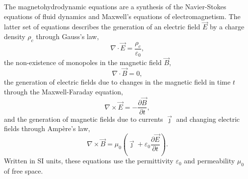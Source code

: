 The magnetohydrodynamic equations are a synthesis of the Navier-Stokes equations of fluid dynamics and Maxwell's equations of electromagnetism. The latter set of equations describes the generation of an electric field $\vec{E}$ by a charge density $\rho_c$ through Gauss's law,
\begin{equation}
  \label{eq:gauss_law}
 \nabla \cdot \vec {E} ={\frac {\rho_c }{\varepsilon _{0}}},
\end{equation}
the non-existence of monopoles in the magnetic field $\vec{B}$,
\begin{equation}
  \label{eq:gauss_law_for_magnetism}
  \nabla \cdot \vec {B} =0,
\end{equation}
the generation of electric fields due to changes in the magnetic field in time $t$ through the Maxwell-Faraday equation,
\begin{equation}
  \label{eq:maxwell_faraday}
 \nabla \times \vec {E} =-{\frac {\partial \vec {B} }{\partial t}},
\end{equation}
and the generation of magnetic fields due to currents $\vec{\jmath}$ and changing electric fields through Ampère's law,
\begin{equation}
  \label{eq:ampere_law}
 \nabla \times \vec {B} =\mu _{0}\left(\vec {\jmath} +\varepsilon _{0}{\frac {\partial \vec {E} }{\partial t}}\right).
\end{equation}
Written in SI units, these equations use the permittivity $\varepsilon_{0}$ and permeability $\mu_0$ of free space.

